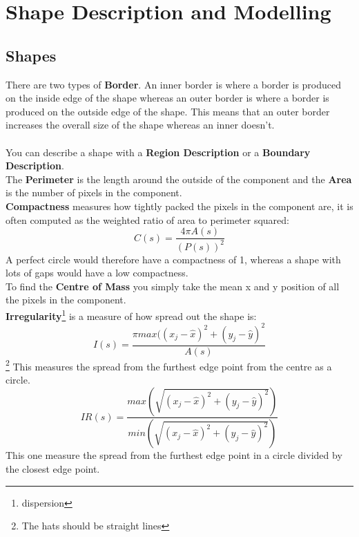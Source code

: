 \documentclass{article}
\begin{document}
	\section{Shape Description and Modelling}
	\subsection{Shapes}
	There are two types of \textbf{Border}. An inner border is where a border is produced on the inside edge of the shape whereas an outer border is where a border is produced on the outside edge of the shape. This means that an outer border increases the overall size of the shape whereas an inner doesn't.\\
	\\
	You can describe a shape with a \textbf{Region Description} or a \textbf{Boundary Description}.\\
	The \textbf{Perimeter} is the length around the outside of the component and the \textbf{Area} is the number of pixels in the component.\\
	\textbf{Compactness} measures how tightly packed the pixels in the component are, it is often computed as the weighted ratio of area to perimeter squared:
	$$C(s)=\frac{4\pi A(s)}{(P(s))^2}$$
	A perfect circle would therefore have a compactness of 1, whereas a shape with lots of gaps would have a low compactness.\\
	To find the \textbf{Centre of Mass} you simply take the mean x and y position of all the pixels in the component.\\
	\textbf{Irregularity}\footnote{dispersion} is a measure of how spread out the shape is:
	$$I(s)=\frac{\pi max((x_j-\hat{x})^2+(y_j-\hat{y})^2}{A(s)}$$\footnote{The hats should be straight lines}
	This measures the spread from the furthest edge point from the centre as a circle.
	$$IR(s)=\frac{max(\sqrt{(x_j-\hat{x})^2+(y_j-\hat{y})^2})}{min(\sqrt{(x_j-\hat{x})^2+(y_j-\hat{y})^2})}$$
	This one measure the spread from the furthest edge point in a circle divided by the closest edge point.
\end{document}
